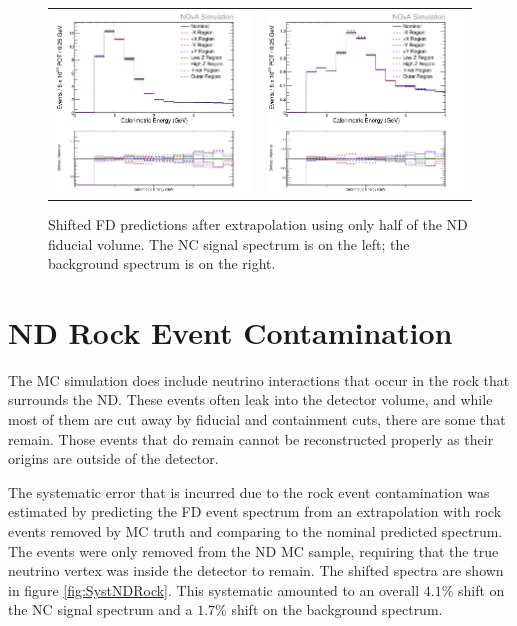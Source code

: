 \begin{figure}[htb]
  \centering
  \begin{tabular}{c c}
    \includegraphics[width=.47\textwidth]{figures/Systs/cNCEXFidContSysts.png} &
    \includegraphics[width=.47\textwidth]{figures/Systs/cBGEXFidContSysts.png} \\
  \end{tabular}
  \caption[Shifted FD Predictions from Extrapolation of Halves of the ND]{Shifted FD predictions after extrapolation using only half of the ND fiducial volume. The NC signal spectrum is on the left; the background spectrum is on the right.}
  \label{fig:SystFidCont}
\end{figure}

\section{ND Rock Event Contamination}

The MC simulation does include neutrino interactions that occur in the rock that surrounds the ND. These events often leak into the detector volume, and while most of them are cut away by fiducial and containment cuts, there are some that remain. Those events that do remain cannot be reconstructed properly as their origins are outside of the detector. 

The systematic error that is incurred due to the rock event contamination was estimated by predicting the FD event spectrum from an extrapolation with rock events removed by MC truth and comparing to the nominal predicted spectrum. The events were only removed from the ND MC sample, requiring that the true neutrino vertex was inside the detector to remain. The shifted spectra are shown in figure \ref{fig:SystNDRock}. This systematic amounted to an overall $4.1\%$ shift on the NC signal spectrum and a $1.7\%$ shift on the background spectrum.

